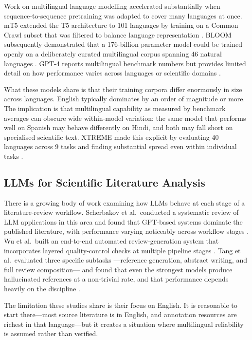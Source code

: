 \documentclass[acmsmall,screen,review]{acmart}
\begin{document}
Work on multilingual language modelling accelerated substantially when
sequence-to-sequence pretraining was adapted to cover many languages at
once.  mT5 extended the T5 architecture to 101 languages by training on a
Common Crawl subset that was filtered to balance language representation
\citep{xue2021mt5}.  BLOOM subsequently demonstrated that a 176-billion
parameter model could be trained openly on a deliberately curated
multilingual corpus spanning 46 natural languages
\citep{bigscience2022bloom}.  GPT-4 reports multilingual benchmark numbers
but provides limited detail on how performance varies across languages or
scientific domains \citep{openai2023gpt4}.

What these models share is that their training corpora differ enormously
in size across languages.  English typically dominates by an order of
magnitude or more.  The implication is that multilingual capability as
measured by benchmark averages can obscure wide within-model variation:
the same model that performs well on Spanish may behave differently on
Hindi, and both may fall short on specialised scientific text.  XTREME
made this explicit by evaluating 40 languages across 9 tasks and finding
substantial spread even within individual tasks \citep{hu2020xtreme}.

\subsection{LLMs for Scientific Literature Analysis}
\label{sec:lit-review-automation}

There is a growing body of work examining how LLMs behave at each stage
of a literature-review workflow.  Scherbakov et al.\ conducted a
systematic review of LLM applications in this area and found that
GPT-based systems dominate the published literature, with performance
varying noticeably across workflow stages \citep{scherbakov2025emergence}.
Wu et al.\ built an end-to-end automated review-generation system that
incorporates layered quality-control checks at multiple pipeline stages
\citep{wu2025automated}.  Tang et al.\ evaluated three specific subtasks
---reference generation, abstract writing, and full review composition---
and found that even the strongest models produce hallucinated references at
a non-trivial rate, and that performance depends heavily on the
discipline \citep{tang2025automated}.

The limitation these studies share is their focus on English.  It is
reasonable to start there---most source literature is in English, and
annotation resources are richest in that language---but it creates a
situation where multilingual reliability is assumed rather than verified.
\end{document}
